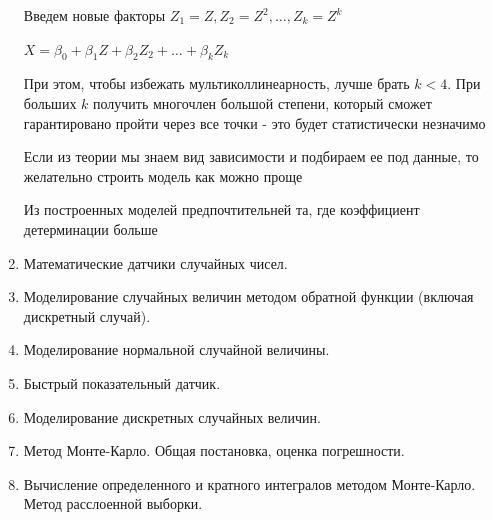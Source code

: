 \documentclass[12pt]{article}
\begin{document}
\begin{enumerate}
    Введем новые факторы $Z_1 = Z, Z_2 = Z^2, \dots, Z_k = Z^k$

    $X = \beta_0 + \beta_1 Z + \beta_2 Z_2 + \dots + \beta_k Z_k$

    При этом, чтобы избежать мультиколлинеарность, лучше брать $k < 4$. При больших $k$ получить многочлен большой степени, который сможет гарантировано пройти через все точки - это будет статистически незначимо


    \Nota Если из теории мы знаем вид зависимости и подбираем ее под данные, то желательно строить модель как можно проще

    \Notas Из построенных моделей предпочтительней та, где коэффициент детерминации больше

    \item Математические датчики случайных чисел.
    \item Моделирование случайных величин методом обратной функции (включая дискретный случай).
    \item Моделирование нормальной случайной величины.
    \item Быстрый показательный датчик.
    \item Моделирование дискретных случайных величин.
    \item Метод Монте-Карло. Общая постановка, оценка погрешности.
    \item Вычисление определенного и кратного интегралов методом Монте-Карло. Метод расслоенной выборки.
\end{enumerate}

\end{document}
